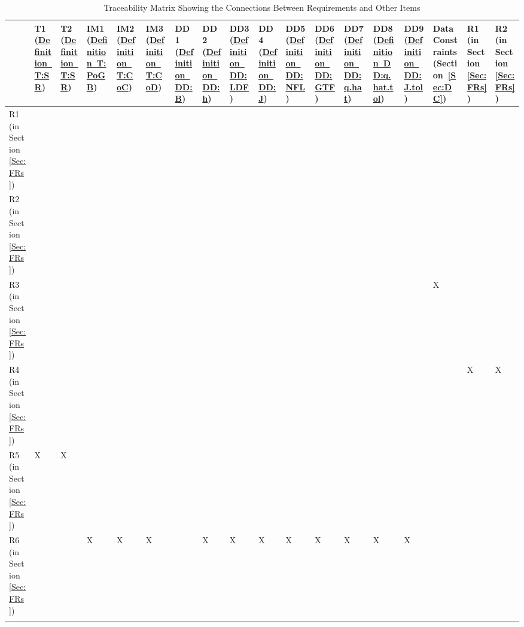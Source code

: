 \documentclass[12pt]{article}
\begin{document}
\begin{longtable}{l l l l l l l l l l l l l l l l l l}
\toprule
 & T1 (\hyperref[T:SR]{Definition~T:SR}) & T2 (\hyperref[T:SR]{Definition~T:SR}) & IM1 (\hyperref[T:PoGB]{Definition~T:PoGB}) & IM2 (\hyperref[T:CoC]{Definition~T:CoC}) & IM3 (\hyperref[T:CoD]{Definition~T:CoD}) & DD1 (\hyperref[DD:B]{Definition~DD:B}) & DD2 (\hyperref[DD:h]{Definition~DD:h}) & DD3 (\hyperref[DD:LDF]{Definition~DD:LDF}) & DD4 (\hyperref[DD:J]{Definition~DD:J}) & DD5 (\hyperref[DD:NFL]{Definition~DD:NFL}) & DD6 (\hyperref[DD:GTF]{Definition~DD:GTF}) & DD7 (\hyperref[DD:q.hat]{Definition~DD:q.hat}) & DD8 (\hyperref[DD:q.hat.tol]{Definition~DD:q.hat.tol}) & DD9 (\hyperref[DD:J.tol]{Definition~DD:J.tol}) & Data Constraints (Section~\ref{Sec:DC}) & R1 (in Section~\ref{Sec:FRs}) & R2 (in Section~\ref{Sec:FRs})
\\
\midrule
R1 (in Section~\ref{Sec:FRs}) &  &  &  &  &  &  &  &  &  &  &  &  &  &  &  &  & 
\\
R2 (in Section~\ref{Sec:FRs}) &  &  &  &  &  &  &  &  &  &  &  &  &  &  &  &  & 
\\
R3 (in Section~\ref{Sec:FRs}) &  &  &  &  &  &  &  &  &  &  &  &  &  &  & X &  & 
\\
R4 (in Section~\ref{Sec:FRs}) &  &  &  &  &  &  &  &  &  &  &  &  &  &  &  & X & X
\\
R5 (in Section~\ref{Sec:FRs}) & X & X &  &  &  &  &  &  &  &  &  &  &  &  &  &  & 
\\
R6 (in Section~\ref{Sec:FRs}) &  &  & X & X & X &  & X & X & X & X & X & X & X & X &  &  & 
\\
\bottomrule
\caption{Traceability Matrix Showing the Connections Between Requirements and Other Items}
\label{Table:TMStCBRaOI}
\end{longtable}
\end{document}
